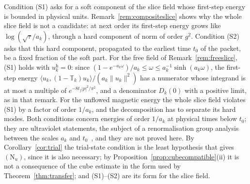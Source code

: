 \documentclass[11pt]{amsart}
\theoremstyle{definition}
\theoremstyle{remark}
\numberwithin{equation}{section}
\newcommand{\ip}[2]{\langle #1,#2\rangle}
\begin{document}
Condition (S1) asks for a soft component of the slice field whose first-step
energy is bounded in physical units. Remark~\ref{rem:compositeslice} shows why
the whole slice field is not a candidate: at next order its first-step energy
grows like $\log(\sqrt\tau/a_k)$, through a hard component of norm of order
$g^2$. Condition (S2) asks that this hard component, propagated to the
earliest time $t_0$ of the packet, be a fixed fraction of the soft part.
For the free field of Remark~\ref{rem:freeslice}, (S1) holds with
$u^{\mathrm h}_k=0$: since $(1-e^{-a_k\omega})/a_k\le\omega\le
a_k^{-1}\sinh(a_k\omega)$, the first-step energy
$\ip{u_k}{(1-\mathbb T_k)u_k}/(a_k\|u_k\|^2)$ has a numerator whose
integrand is at most a multiple of $e^{-8t_f|p|^2/\pi^2}$, and a denominator $D_k(0)$ with a positive limit, as
in that remark. For the unflowed magnetic energy the whole slice field
violates (S1) by a factor of order $1/a_k$, and the decomposition has to
separate its hard modes. Both conditions concern energies of order $1/a_k$ at
physical times below $t_0$; they are ultraviolet statements, the subject of a
renormalisation group analysis between the scales $a_k$ and
$t_0$~\cite{Bal84a,Bal85a,Bal89b}, and they are not proved here. By
Corollary~\ref{cor:trial} the trial-state condition is the least hypothesis
that gives $(\mathrm N_u)$, since it is also necessary; by
Proposition~\ref{prop:cubecompatible}(ii) it is not a consequence of the cube
estimate in the form used by Theorem~\ref{thm:transfer}; and (S1)--(S2) are
its form for the slice field.
\end{document}
